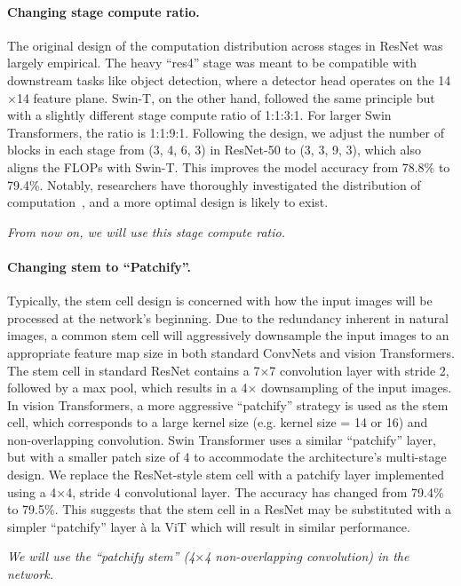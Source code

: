 \paragraph{Changing stage compute ratio.} 
The original design of the computation distribution across stages in ResNet was largely empirical. The heavy ``res4'' stage was meant to be compatible with downstream tasks like object detection, where a detector head operates on the 14$\times$14 feature plane. 
Swin-T, on the other hand, followed the same principle but with a slightly different stage compute ratio of 1:1:3:1. For larger Swin Transformers, the ratio is 1:1:9:1. Following the design, we adjust the number of blocks in each stage from (3, 4, 6, 3) in ResNet-50 to (3, 3, 9, 3), which also aligns the FLOPs with Swin-T. This improves the model accuracy from 78.8\% to 79.4\%. Notably, researchers have thoroughly investigated the distribution of computation~\cite{Radosavovic2019network, Radosavovic2020designing}, and a more optimal design is likely to exist. 

\textit{From now on, we will use this stage compute ratio.} 

\paragraph{Changing stem to ``Patchify''.}
Typically, the stem cell design is concerned with how the input images will be processed at the network's beginning. Due to the redundancy inherent in natural images, a common stem cell will aggressively downsample the input images to an appropriate feature map size in both standard ConvNets and vision Transformers. The stem cell in standard ResNet contains a 7$\times$7 convolution layer with stride 2, followed by a max pool, which results in a 4$\times$ downsampling of the input images. In vision Transformers, a more aggressive ``patchify'' strategy is used as the stem cell, which corresponds to a large kernel size (e.g. kernel size = 14 or 16) and non-overlapping convolution. Swin Transformer uses a similar ``patchify'' layer, but with a smaller patch size of 4 to accommodate the architecture's multi-stage design. 
We replace the ResNet-style stem cell with a patchify layer implemented using a 4$\times$4, stride 4 convolutional layer. The accuracy has changed from 79.4\% to 79.5\%. This suggests that the stem cell in a ResNet may be substituted with a simpler ``patchify'' layer à la ViT which will result in similar performance.

\textit{We will use the ``patchify stem'' (4$\times$4 non-overlapping convolution) in the network.} 

